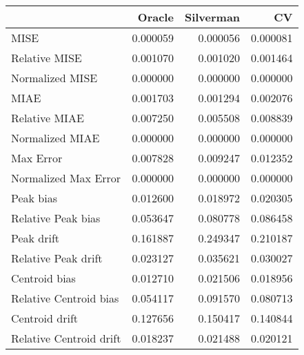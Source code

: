 \begin{tabular}{lrrr}
  \hline
 & Oracle & Silverman & CV \\ 
  \hline
MISE & 0.000059 & 0.000056 & 0.000081 \\ 
  Relative MISE & 0.001070 & 0.001020 & 0.001464 \\ 
  Normalized MISE & 0.000000 & 0.000000 & 0.000000 \\ 
  MIAE & 0.001703 & 0.001294 & 0.002076 \\ 
  Relative MIAE & 0.007250 & 0.005508 & 0.008839 \\ 
  Normalized MIAE & 0.000000 & 0.000000 & 0.000000 \\ 
  Max Error & 0.007828 & 0.009247 & 0.012352 \\ 
  Normalized Max Error & 0.000000 & 0.000000 & 0.000000 \\ 
  Peak bias & 0.012600 & 0.018972 & 0.020305 \\ 
  Relative Peak bias & 0.053647 & 0.080778 & 0.086458 \\ 
  Peak drift & 0.161887 & 0.249347 & 0.210187 \\ 
  Relative Peak drift & 0.023127 & 0.035621 & 0.030027 \\ 
  Centroid bias & 0.012710 & 0.021506 & 0.018956 \\ 
  Relative Centroid bias & 0.054117 & 0.091570 & 0.080713 \\ 
  Centroid drift & 0.127656 & 0.150417 & 0.140844 \\ 
  Relative Centroid drift & 0.018237 & 0.021488 & 0.020121 \\ 
   \hline
\end{tabular}
